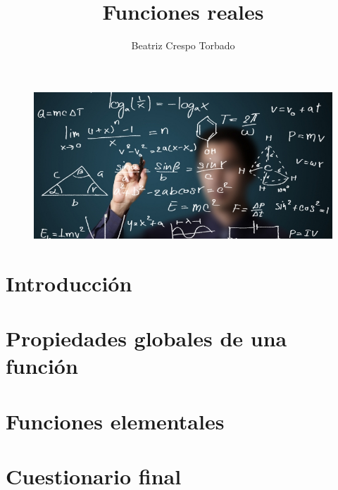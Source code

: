 \documentclass[12pt,a4paper,twoside]{article}
\title{Funciones reales}
\author{Beatriz Crespo Torbado}
\begin{document}
\maketitle
\begin{figure}
	\includegraphics{samples/introduccion_imagen.jpg}
	\centering
\end{figure}


\tableofcontents



\section{Introducción}


\section{Propiedades globales de una función}


\section{Funciones elementales}


\section{Cuestionario final}

\end{document}
